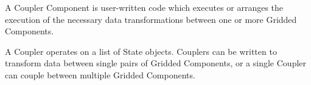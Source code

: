 %


A Coupler Component is user-written code which executes or
arranges the execution of the necessary data transformations between one
or more Gridded Components.


A Coupler operates on a list of State objects.  Couplers can be written
to transform data between single pairs of Gridded Components, or
a single Coupler can couple between multiple Gridded Components.

